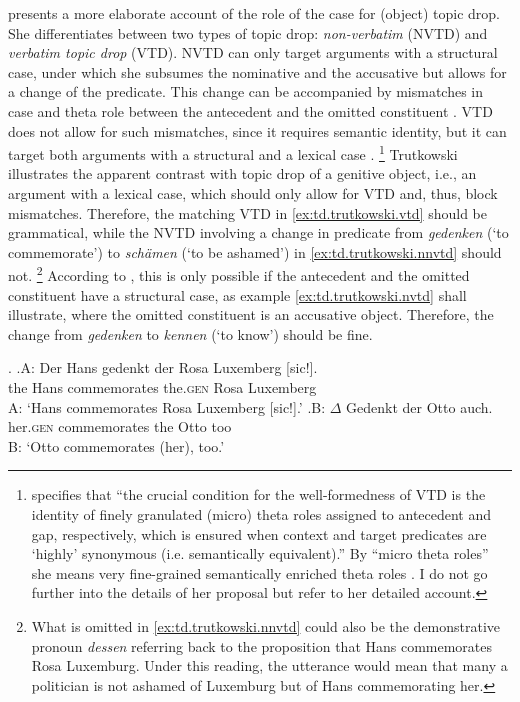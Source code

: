 \citet{trutkowski2016} presents a more elaborate account of the role of the case for (object) topic drop.
She differentiates between two types of topic drop: \textit{non-verbatim} (NVTD) and \textit{verbatim topic drop} (VTD).
NVTD can only target arguments  with a structural case,  under which she subsumes the nominative  and the accusative  but allows for a change of the predicate.
This change can be accompanied by mismatches in case and theta role between the antecedent  and the omitted constituent \citep[3]{trutkowski2016}.
VTD does not allow for such mismatches, since it requires semantic identity, but it can target both arguments with a structural and a lexical case \citep[3]{trutkowski2016}.%
\footnote{\citet[31]{trutkowski2016} specifies that ``the crucial condition for the well-formedness of VTD is the identity of finely granulated (micro) theta roles assigned to antecedent  and gap, respectively, which is ensured when context and target predicates are `highly' synonymous (i.e. semantically equivalent).'' 
By ``micro theta roles'' she means very fine-grained semantically enriched theta roles \citep[31]{trutkowski2016}.
I do not go further into the details of her proposal but refer to her detailed account.
}
Trutkowski illustrates the apparent contrast with topic drop of a genitive  object, i.e., an argument with a lexical case, which should only allow for VTD and, thus, block mismatches.
Therefore, the matching VTD in \ref{ex:td.trutkowski.vtd} should be grammatical, while the NVTD involving a change in predicate from \textit{gedenken} (`to commemorate') to \textit{schämen} (`to be ashamed') in \ref{ex:td.trutkowski.nnvtd} should not.%
\footnote{What is omitted in \ref{ex:td.trutkowski.nnvtd} could also be the demonstrative pronoun \textit{dessen} referring back to the proposition that Hans commemorates Rosa Luxemburg.
Under this reading, the utterance would mean that many a politician is not ashamed of Luxemburg but of Hans commemorating her.}
%
According to \citet{trutkowski2016}, this is only possible if the antecedent  and the omitted constituent have a structural case,  as example \ref{ex:td.trutkowski.nvtd} shall illustrate, where the omitted constituent is an accusative object. 
Therefore, the change from \textit{gedenken} to \textit{kennen} (`to know') should be fine.

\ex.\label{ex:td.trutkowski.vtd}
\ag.A: Der Hans gedenkt der Rosa Luxemberg [sic!].\\
{} the Hans commemorates the.\textsc{gen} Rosa Luxemberg \\
A: `Hans commemorates Rosa Luxemberg [sic!].'
\bg.B: $\Delta$ Gedenkt der Otto auch.\\
{} her.\textsc{gen} commemorates the Otto too\\
B: `Otto commemorates (her), too.' \citep[VTD,][4, her judgment]{trutkowski2016}

